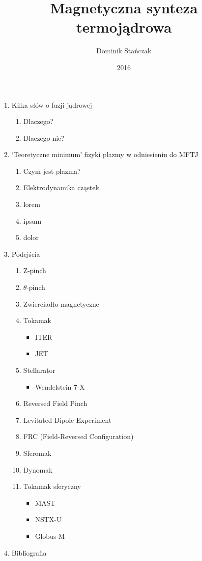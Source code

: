 \documentclass{article}
\begin{document}
\title{Magnetyczna synteza termojądrowa}
\author{Dominik Stańczak}
\date{2016}

\maketitle
\begin{enumerate}
    \item Kilka słów o fuzji jądrowej
    \begin{enumerate}
        \item Dlaczego?
        \item Dlaczego nie?
    \end{enumerate}
    \item `Teoretyczne minimum' fizyki plazmy w odniesieniu do MFTJ
    \begin{enumerate}
        \item Czym jest plazma?
        \item Elektrodynamika cząstek
        \item lorem
        \item ipsum
        \item dolor
    \end{enumerate}
    \item Podejścia
    \begin{enumerate}
        \item Z-pinch
        \item $\theta$-pinch
        \item Zwierciadło magnetyczne
        \item Tokamak
        \begin{itemize}
            \item ITER
            \item JET
        \end{itemize}
        \item Stellarator
        \begin{itemize}
            \item Wendelstein 7-X
        \end{itemize}
        \item Reversed Field Pinch
        \item Levitated Dipole Experiment
        \item FRC (Field-Reversed Configuration)
        \item Sferomak
        \item Dynomak
        \item Tokamak sferyczny
        \begin{itemize}
            \item MAST
            \item NSTX-U
            \item Globus-M
        \end{itemize}
    \end{enumerate}
    \item Bibliografia
\end{enumerate}
\end{document}
